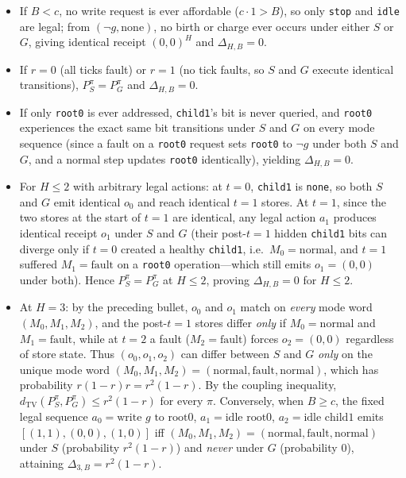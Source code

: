 \documentclass[11pt,a4paper]{article}
\newcounter{none}
\providecommand{\tightlist}{\setlength{\itemsep}{2pt}\setlength{\parskip}{0pt}}
\begin{document}
\begin{itemize}
\tightlist
\item
  If \(B < c\), no write request is ever affordable (\(c \cdot 1 > B\)),
  so only \texttt{stop} and \texttt{idle} are legal; from
  \((\neg g, \mathrm{none})\), no birth or charge ever occurs under
  either \(S\) or \(G\), giving identical receipt \((0,0)^H\) and
  \(\Delta_{H,B} = 0\).
\item
  If \(r = 0\) (all ticks fault) or \(r = 1\) (no tick faults, so \(S\)
  and \(G\) execute identical transitions), \(P_S^\pi = P_G^\pi\) and
  \(\Delta_{H,B} = 0\).
\item
  If only \texttt{root0} is ever addressed, \texttt{child1}'s bit is
  never queried, and \texttt{root0} experiences the exact same bit
  transitions under \(S\) and \(G\) on every mode sequence (since a
  fault on a \texttt{root0} request sets \texttt{root0} to \(\neg g\)
  under both \(S\) and \(G\), and a normal step updates \texttt{root0}
  identically), yielding \(\Delta_{H,B} = 0\).
\item
  For \(H \le 2\) with arbitrary legal actions: at \(t = 0\),
  \texttt{child1} is \texttt{none}, so both \(S\) and \(G\) emit
  identical \(o_0\) and reach identical \(t=1\) stores. At \(t = 1\),
  since the two stores at the start of \(t=1\) are identical, any legal
  action \(a_1\) produces identical receipt \(o_1\) under \(S\) and
  \(G\) (their post-\(t=1\) hidden \texttt{child1} bits can diverge only
  if \(t=0\) created a healthy \texttt{child1},
  i.e.~\(M_0 = \mathrm{normal}\), and \(t=1\) suffered
  \(M_1 = \mathrm{fault}\) on a \texttt{root0} operation---which still
  emits \(o_1 = (0,0)\) under both). Hence \(P_S^\pi = P_G^\pi\) at
  \(H \le 2\), proving \(\Delta_{H,B} = 0\) for \(H \le 2\).
\item
  At \(H = 3\): by the preceding bullet, \(o_0\) and \(o_1\) match on
  \emph{every} mode word \((M_0, M_1, M_2)\), and the post-\(t=1\)
  stores differ \emph{only} if \(M_0 = \mathrm{normal}\) and
  \(M_1 = \mathrm{fault}\), while at \(t=2\) a fault
  (\(M_2 = \mathrm{fault}\)) forces \(o_2 = (0,0)\) regardless of store
  state. Thus \((o_0, o_1, o_2)\) can differ between \(S\) and \(G\)
  \emph{only} on the unique mode word
  \((M_0, M_1, M_2) = (\mathrm{normal}, \mathrm{fault}, \mathrm{normal})\),
  which has probability \(r(1-r)r = r^2(1-r)\). By the coupling
  inequality, \(d_{\mathrm{TV}}(P_S^\pi, P_G^\pi) \le r^2(1-r)\) for
  every \(\pi\). Conversely, when \(B \ge c\), the fixed legal sequence
  \(a_0 = \text{write }g\text{ to root0}\), \(a_1 = \text{idle root0}\),
  \(a_2 = \text{idle child1}\) emits \([(1,1), (0,0), (1,0)]\) iff
  \((M_0, M_1, M_2) = (\mathrm{normal}, \mathrm{fault}, \mathrm{normal})\)
  under \(S\) (probability \(r^2(1-r)\)) and \emph{never} under \(G\)
  (probability \(0\)), attaining \(\Delta_{3,B} = r^2(1-r)\).
\end{itemize}
\end{document}
